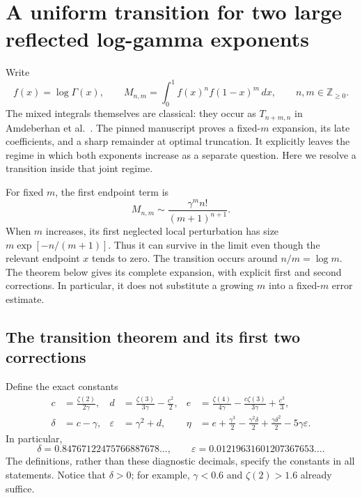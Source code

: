 \section{A uniform transition for two large reflected log-gamma exponents}
\label{joint:sec:moments}

Write
\[
 f(x)=\log\Gamma(x),\qquad
 M_{n,m}=\int_0^1 f(x)^n f(1-x)^m\,dx,
 \qquad n,m\in\mathbb Z_{\geq0}.
\]
The mixed integrals themselves are classical: they occur as
$T_{n+m,n}$ in Amdeberhan et al.\ \cite[Section~5]{gaussian:ACEMKM}.
The pinned manuscript proves a fixed-$m$ expansion, its late coefficients,
and a sharp remainder at optimal truncation. It explicitly leaves the
regime in which both exponents increase as a separate question.
Here we resolve a transition inside that joint regime.

For fixed $m$, the first endpoint term is
\[
 M_{n,m}\sim\frac{\gamma^m n!}{(m+1)^{n+1}}.
\]
When $m$ increases, its first neglected local perturbation has size
$m\exp[-n/(m+1)]$. Thus it can survive in the limit even though the
relevant endpoint $x$ tends to zero. The transition occurs around
$n/m=\log m$. The theorem below gives its complete expansion, with
explicit first and second corrections. In particular, it does not
substitute a growing $m$ into a fixed-$m$ error estimate.

\subsection{The transition theorem and its first two corrections}

Define the exact constants
\begin{align}
 c&=\frac{\zeta(2)}{2\gamma},&
 d&=\frac{\zeta(3)}{3\gamma}-\frac{c^2}{2},&
 e&=\frac{\zeta(4)}{4\gamma}
       -\frac{c\zeta(3)}{3\gamma}+\frac{c^3}{3},\label{joint:eq:constants1}\\
 \delta&=c-\gamma,&
 \varepsilon&=\gamma^2+d,&
 \eta&=e+\frac{\gamma^3}{2}-\frac{\gamma^2\delta}{2}
          +\frac{\gamma\delta^2}{2}-5\gamma\varepsilon.
 \label{joint:eq:constants2}
\end{align}
In particular,
\[
 \delta=0.84767122475766887678\ldots,
 \qquad
 \varepsilon=0.01219631601207367653\ldots.
\]
The definitions, rather than these diagnostic decimals, specify the
constants in all statements. Notice that $\delta>0$; for example,
$\gamma<0.6$ and $\zeta(2)>1.6$ already suffice.

